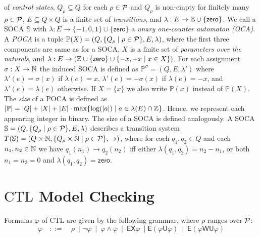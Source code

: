 \documentclass[times,envcountsame]{llncs}
\def\CTL{{\text{CTL}}}
\def\U{{\mathsf{U}}}
\def\WU{{\mathsf{WU}}}
\def\EX{{\mathsf{EX}}}
\def\E{{\mathsf{E}}}
\newcommand{\prop}{\rho}
\newcommand{\zero}{\ensuremath{\mathsf{zero}}}
\newcommand{\Poca}{\mathbb{P}}
\newcommand{\Soca}{\mathbb{S}}
\begin{document}
of {\em control states}, $Q_\prop\subseteq Q$ for each $\prop\in\Prop$ and
$Q_\rho$ is non-empty for finitely many $\prop\in\Prop$,
$E\subseteq Q\times Q$ is a finite set of {\em transitions}, and
$\lambda:E\rightarrow \Z\cup\{\zero\}$.
We call a SOCA $\Soca$ with $\lambda:E\rightarrow
\{-1,0,1\}\cup\{\zero\}$ a {\em unary one-counter automaton (OCA)}.
A {\em POCA} is a tuple
$\Poca(X)=(Q,\{Q_\prop\mid\prop\in\Prop\},E,\lambda)$, where the first
three components are same as for a SOCA,
$X$ is a finite set of {\em parameters over the naturals},
and $\lambda:E\rightarrow
(\Z\cup\{\zero\}\cup\{-x, +x\mid x\in X\})$.
For each assignment $\sigma:X\rightarrow\mathbb{N}$  the
induced SOCA is defined as $\Poca^\sigma=(Q,E,\lambda')$
where $\lambda'(e)=\sigma(x)$ if $\lambda(e)=x$,
$\lambda'(e)=-\sigma(x)$ if $\lambda(e)=-x$, and
$\lambda'(e)=\lambda(e)$ otherwise.
If $X=\{x\}$ we also write $\Poca(x)$ instead of $\Poca(X)$.
The {\em size} of a POCA is defined as
$|\Poca|=|Q|+|X|+|E|\cdot\max\{\log(|a|)\mid a\in\lambda(E)\cap\Z\}$.
Hence, we represent each appearing
integer in binary.
The size of a SOCA is defined analogously.
A SOCA $\Soca=(Q,\{Q_\prop\mid \prop\in\Prop\},E,\lambda)$ describes a transition system $T(\Soca)=(Q\times\N,\{Q_\prop\times\N\mid
\prop\in\Prop\}, \rightarrow)$, where for each $q_1,q_2\in Q$ and each
$n_1,n_2\in\mathbb{N}$ we have $q_1(n_1)\rightarrow q_2(n_2)$ iff
either $\lambda(q_1,q_2)=n_2-n_1$, or both
$n_1=n_2=0$ and $\lambda(q_1,q_2)=\zero$.


\section{$\CTL$ Model Checking}
Formulas $\varphi$ of CTL are given by the following
grammar, where $\prop$ ranges over $\mathcal{P}$:
\begin{equation*}
\varphi\quad ::=\quad \prop\ \mid \neg\varphi\ \mid\ \varphi\wedge\varphi\ \mid\
\EX\varphi\ \mid \E (\varphi\U\varphi)\ \mid\
\E(\varphi\WU\varphi)
\end{equation*}
\iffalse
\end{document}
